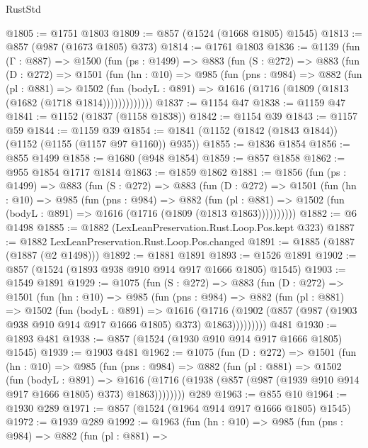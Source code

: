 \begin{lexlean}{RustStd}
\begin{coremodule}
{\begin{coremodule}
{{{{{{{{{@1805 := @1751 @1803
@1809 := @857 (@1524 (@1668 @1805) @1545)
@1813 := @857 (@987 (@1673 @1805) @373)
@1814 := @1761 @1803
@1836 := @1139
    (fun (Γ : @887) =>
    @1500
      (fun (ps : @1499) =>
      @883
        (fun (S : @272) =>
        @883
          (fun (D : @272) =>
          @1501
            (fun (hn : @10) =>
            @985
              (fun (pns : @984) =>
              @882
                (fun (pl : @881) =>
                @1502
                  (fun (bodyL : @891) => @1616 (@1716 (@1809 (@1813 (@1682 (@1718 @1814)))))))))))))
@1837 := @1154 @47
@1838 := @1159 @47
@1841 := @1152 (@1837 (@1158 @1838))
@1842 := @1154 @39
@1843 := @1157 @59
@1844 := @1159 @39
@1854 := @1841 (@1152 (@1842 (@1843 @1844)) (@1152 (@1155 (@1157 @97 @1160)) @935))
@1855 := @1836 @1854
@1856 := @855 @1499
@1858 := @1680 (@948 @1854)
@1859 := @857 @1858
@1862 := @955 @1854 @1717 @1814
@1863 := @1859 @1862
@1881 := @1856
    (fun (ps : @1499) =>
    @883
      (fun (S : @272) =>
      @883
        (fun (D : @272) =>
        @1501
          (fun (hn : @10) =>
          @985
            (fun (pns : @984) =>
            @882
              (fun (pl : @881) =>
              @1502 (fun (bodyL : @891) => @1616 (@1716 (@1809 (@1813 @1863))))))))))
@1882 := @6 @1498
@1885 := @1882 (LexLeanPreservation.Rust.Loop.Pos.kept @323)
@1887 := @1882 LexLeanPreservation.Rust.Loop.Pos.changed
@1891 := @1885 (@1887 (@1887 (@2 @1498)))
@1892 := @1881 @1891
@1893 := @1526 @1891
@1902 := @857 (@1524 (@1893 @938 @910 @914 @917 @1666 @1805) @1545)
@1903 := @1549 @1891
@1929 := @1075
    (fun (S : @272) =>
    @883
      (fun (D : @272) =>
      @1501
        (fun (hn : @10) =>
        @985
          (fun (pns : @984) =>
          @882
            (fun (pl : @881) =>
            @1502
              (fun (bodyL : @891) =>
              @1616
                (@1716
                  (@1902 (@857 (@987 (@1903 @938 @910 @914 @917 @1666 @1805) @373) @1863)))))))))
    @481
@1930 := @1893 @481
@1938 := @857 (@1524 (@1930 @910 @914 @917 @1666 @1805) @1545)
@1939 := @1903 @481
@1962 := @1075
    (fun (D : @272) =>
    @1501
      (fun (hn : @10) =>
      @985
        (fun (pns : @984) =>
        @882
          (fun (pl : @881) =>
          @1502
            (fun (bodyL : @891) =>
            @1616 (@1716 (@1938 (@857 (@987 (@1939 @910 @914 @917 @1666 @1805) @373) @1863))))))))
    @289
@1963 := @855 @10
@1964 := @1930 @289
@1971 := @857 (@1524 (@1964 @914 @917 @1666 @1805) @1545)
@1972 := @1939 @289
@1992 := @1963
    (fun (hn : @10) =>
    @985
      (fun (pns : @984) =>
      @882
        (fun (pl : @881) =>
}}}}}}}}}
\end{coremodule}}
\end{coremodule}
\end{lexlean}
